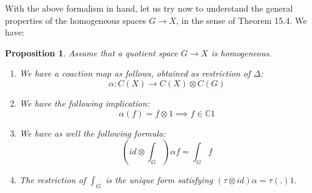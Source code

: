 \documentclass[12pt]{amsbook}
\newtheorem{proposition}[theorem]{Proposition}
\begin{document}
With the above formalism in hand, let us try now to understand the general properties of the homogeneous spaces $G\to X$, in the sense of Theorem 15.4. We have:


\begin{proposition}
Assume that a quotient space $G\to X$ is homogeneous.
\begin{enumerate}
\item We have a coaction map as follows, obtained as restriction of $\Delta$:
$$\alpha:C(X)\to C(X)\otimes C(G)$$

\item We have the following implication:
$$\alpha(f)=f\otimes 1\implies f\in\mathbb C1$$

\item We have as well the following formula:
$$\left(id\otimes\int_G\right)\alpha f=\int_Gf$$

\item The restriction of $\int_G$ is the unique form satisfying $(\tau\otimes id)\alpha=\tau(.)1$.
\end{enumerate} 
\end{proposition}
\end{document}
